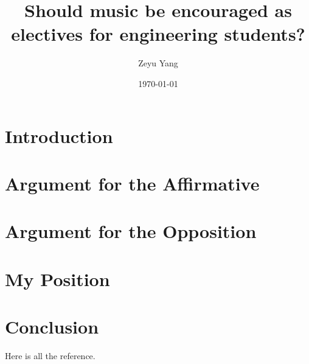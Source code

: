 \documentclass[titlepage,a4paper,12pt]{article}
\begin{document}
    \title{Should music be encouraged as electives for engineering students?}
    \author{Zeyu Yang}
    \date{\today}
    \maketitle
    \tableofcontents
    \listoffigures
    

    \section{Introduction}
    
    
    \section{Argument for the Affirmative}


    
    
    \section{Argument for the Opposition}
    
    \section{My Position}
    
    \section{Conclusion}
    
    \begin{appendix}
        Here is all the reference.
    \end{appendix}
\end{document}
